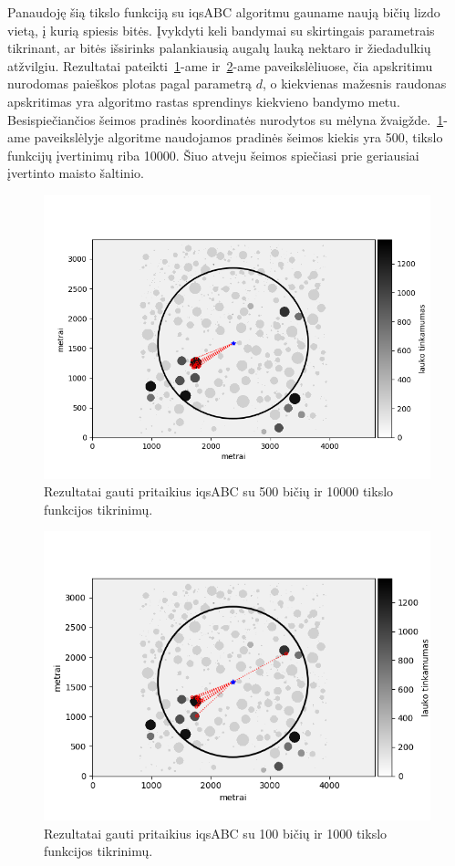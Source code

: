 \documentclass{VUMIFKompMagistrinis}
\begin{document}
Panaudoję šią tikslo funkciją su iqsABC algoritmu gauname naują bičių lizdo vietą, į kurią spiesis bitės. Įvykdyti keli bandymai su skirtingais parametrais tikrinant, ar bitės išsirinks palankiausią augalų lauką nektaro ir žiedadulkių atžvilgiu. Rezultatai pateikti~\ref{step1}-ame ir~\ref{step2}-ame paveikslėliuose, čia apskritimu nurodomas paieškos plotas pagal parametrą $d$, o kiekvienas mažesnis raudonas apskritimas yra algoritmo rastas sprendinys kiekvieno bandymo metu. Besispiečiančios šeimos pradinės koordinatės nurodytos su mėlyna žvaigžde.~\ref{step1}-ame paveikslėlyje algoritme naudojamos pradinės šeimos kiekis yra 500, tikslo funkcijų įvertinimų riba 10000. Šiuo atveju šeimos spiečiasi prie geriausiai įvertinto maisto šaltinio.



\begin{figure}
    \centering
    \includegraphics[scale=0.7]{img/new/step1.png}
    \caption{Rezultatai gauti  pritaikius iqsABC su 500 bičių ir 10000 tikslo funkcijos tikrinimų.}
    \label{step1}
\end{figure}

\begin{figure}
    \centering
    \includegraphics[scale=0.8]{img/new/step2.png}
    \caption{Rezultatai gauti  pritaikius iqsABC su 100 bičių ir 1000 tikslo funkcijos tikrinimų.}
    \label{step2}
\end{figure}
\end{document}
